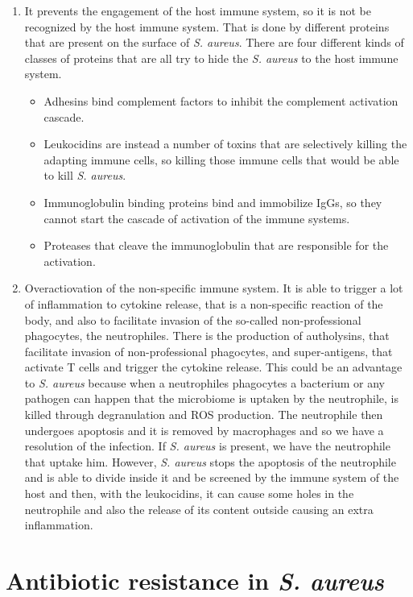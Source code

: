 \begin{enumerate}
    \item It prevents the engagement of the host immune system, so it is not be recognized by the host immune system. That is done by different proteins that are present on the  surface of \emph{S. aureus}. There are four different kinds of classes of proteins that are all try to hide the \emph{S. aureus} to the host immune system. 
    \begin{itemize}
        \item Adhesins bind complement factors to inhibit the complement activation cascade.
        \item Leukocidins are instead a number of toxins that are selectively killing the adapting immune cells, so killing those immune cells that would be able to kill \emph{S. aureus}. 
        \item Immunoglobulin binding proteins bind and immobilize IgGs, so they cannot start the cascade of activation of the immune systems.
        \item Proteases that cleave the immunoglobulin that are responsible for the activation.
    \end{itemize}
    \item Overactiovation of the non-specific immune system. It is able to trigger a lot of inflammation to cytokine release, that is a non-specific reaction of the body, and also to facilitate invasion of the so-called non-professional phagocytes, the neutrophiles. There is the production of autholysins, that facilitate invasion of non-professional phagocytes, and super-antigens, that activate T cells and trigger the cytokine release. This could be an advantage to \emph{S. aureus} because when a neutrophiles phagocytes a bacterium or any pathogen can happen that the microbiome is uptaken by the neutrophile, is killed through degranulation and ROS production. The neutrophile then undergoes apoptosis and it is removed by macrophages and so we have a resolution of the infection. 
    If \emph{S. aureus} is present, we have the neutrophile that uptake him. However, \emph{S. aureus} stops the apoptosis of the neutrophile and is able to divide inside it and be screened by the immune system of the host and then, with the leukocidins, it can cause some holes in the neutrophile and also the release of its content outside causing an extra inflammation. 
\end{enumerate}

\section{Antibiotic resistance in \emph{S. aureus}}

